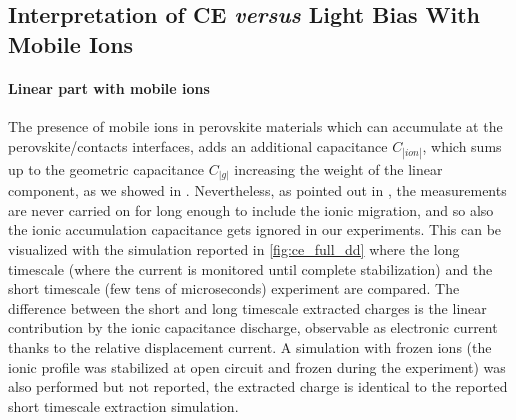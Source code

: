 	\subsection{Interpretation of CE \textsl{versus} Light Bias With Mobile Ions}

		\paragraph{Linear part with mobile ions}
		The presence of mobile ions in perovskite materials which can accumulate at the perovskite/contacts interfaces, adds an additional capacitance $C_|ion|$, which sums up to the geometric capacitance $C_|g|$ increasing the weight of the linear component, as we showed in .
		Nevertheless, as pointed out in , the  measurements are never carried on for long enough to include the ionic migration, and so also the ionic accumulation capacitance gets ignored in our experiments.
		This can be visualized with the simulation reported in \cref{fig:ce_full_dd} where the long timescale (where the current is monitored until complete stabilization) and the short timescale (few tens of microseconds)  experiment are compared.
		The difference between the short and long timescale extracted charges is the linear contribution by the ionic capacitance discharge, observable as electronic current thanks to the relative displacement current.
		A simulation with frozen ions (the ionic profile was stabilized at open circuit and frozen during the  experiment) was also performed but not reported, the extracted charge is identical to the reported short timescale extraction simulation.
		
			\begin{figure}%
	\end{figure}


